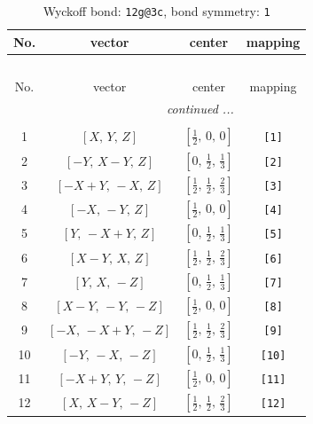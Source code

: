 \documentclass[fleqn,8pt]{jsarticle}
\begin{document}
\begin{longtable}{cccc}
\caption{Wyckoff bond: {\tt 12g@3c}, bond symmetry: {\tt 1}}
 \\
 \hline \hline
No. & vector & center & mapping \\ \hline \endfirsthead

\multicolumn{3}{l}{\tablename\ \thetable{}} \\
 \hline \hline
No. & vector & center & mapping \\ \hline \endhead

 \hline \hline
\multicolumn{3}{r}{\footnotesize\it continued ...} \\ \endfoot

 \hline \hline
\multicolumn{3}{r}{} \\ \endlastfoot

1 & $\left[ X,\, Y,\, Z \right]$ & $\left[ \frac{1}{2},\, 0,\, 0 \right]$ & {\tt [1]} \\ \hline
2 & $\left[ - Y,\, X - Y,\, Z \right]$ & $\left[ 0,\, \frac{1}{2},\, \frac{1}{3} \right]$ & {\tt [2]} \\ \hline
3 & $\left[ - X + Y,\, - X,\, Z \right]$ & $\left[ \frac{1}{2},\, \frac{1}{2},\, \frac{2}{3} \right]$ & {\tt [3]} \\ \hline
4 & $\left[ - X,\, - Y,\, Z \right]$ & $\left[ \frac{1}{2},\, 0,\, 0 \right]$ & {\tt [4]} \\ \hline
5 & $\left[ Y,\, - X + Y,\, Z \right]$ & $\left[ 0,\, \frac{1}{2},\, \frac{1}{3} \right]$ & {\tt [5]} \\ \hline
6 & $\left[ X - Y,\, X,\, Z \right]$ & $\left[ \frac{1}{2},\, \frac{1}{2},\, \frac{2}{3} \right]$ & {\tt [6]} \\ \hline
7 & $\left[ Y,\, X,\, - Z \right]$ & $\left[ 0,\, \frac{1}{2},\, \frac{1}{3} \right]$ & {\tt [7]} \\ \hline
8 & $\left[ X - Y,\, - Y,\, - Z \right]$ & $\left[ \frac{1}{2},\, 0,\, 0 \right]$ & {\tt [8]} \\ \hline
9 & $\left[ - X,\, - X + Y,\, - Z \right]$ & $\left[ \frac{1}{2},\, \frac{1}{2},\, \frac{2}{3} \right]$ & {\tt [9]} \\ \hline
10 & $\left[ - Y,\, - X,\, - Z \right]$ & $\left[ 0,\, \frac{1}{2},\, \frac{1}{3} \right]$ & {\tt [10]} \\ \hline
11 & $\left[ - X + Y,\, Y,\, - Z \right]$ & $\left[ \frac{1}{2},\, 0,\, 0 \right]$ & {\tt [11]} \\ \hline
12 & $\left[ X,\, X - Y,\, - Z \right]$ & $\left[ \frac{1}{2},\, \frac{1}{2},\, \frac{2}{3} \right]$ & {\tt [12]} \\
\end{longtable}
\end{document}
